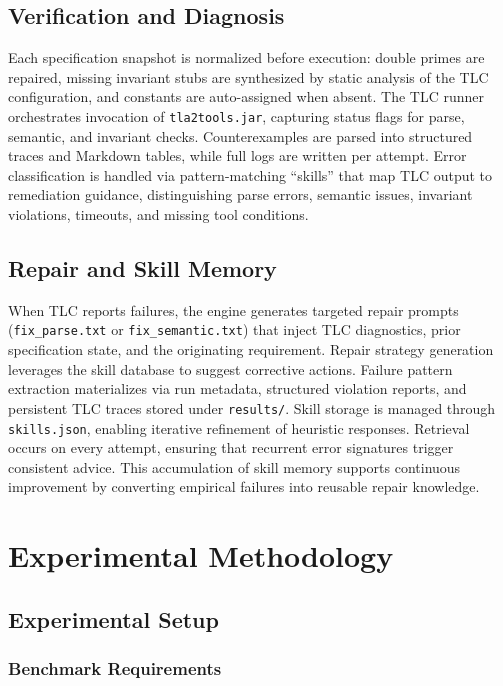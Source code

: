 \subsection{Verification and Diagnosis}

Each specification snapshot is normalized before execution: double primes are repaired, missing invariant stubs are synthesized by static analysis of the TLC configuration, and constants are auto-assigned when absent. The TLC runner orchestrates invocation of \texttt{tla2tools.jar}, capturing status flags for parse, semantic, and invariant checks. Counterexamples are parsed into structured traces and Markdown tables, while full logs are written per attempt. Error classification is handled via pattern-matching ``skills'' that map TLC output to remediation guidance, distinguishing parse errors, semantic issues, invariant violations, timeouts, and missing tool conditions.

\subsection{Repair and Skill Memory}

When TLC reports failures, the engine generates targeted repair prompts (\texttt{fix\_parse.txt} or \texttt{fix\_semantic.txt}) that inject TLC diagnostics, prior specification state, and the originating requirement. Repair strategy generation leverages the skill database to suggest corrective actions. Failure pattern extraction materializes via run metadata, structured violation reports, and persistent TLC traces stored under \texttt{results/}. Skill storage is managed through \texttt{skills.json}, enabling iterative refinement of heuristic responses. Retrieval occurs on every attempt, ensuring that recurrent error signatures trigger consistent advice. This accumulation of skill memory supports continuous improvement by converting empirical failures into reusable repair knowledge.

\section{Experimental Methodology}

\subsection{Experimental Setup}

\subsubsection{Benchmark Requirements}

